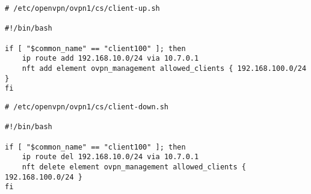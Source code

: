 \begin{verbatim}
# /etc/openvpn/ovpn1/cs/client-up.sh

#!/bin/bash

if [ "$common_name" == "client100" ]; then
	ip route add 192.168.10.0/24 via 10.7.0.1
	nft add element ovpn_management allowed_clients { 192.168.100.0/24 }
fi	
\end{verbatim}

\begin{verbatim}
# /etc/openvpn/ovpn1/cs/client-down.sh
	
#!/bin/bash
	
if [ "$common_name" == "client100" ]; then
	ip route del 192.168.10.0/24 via 10.7.0.1
	nft delete element ovpn_management allowed_clients { 192.168.100.0/24 }
fi	
\end{verbatim}

		
		
		

